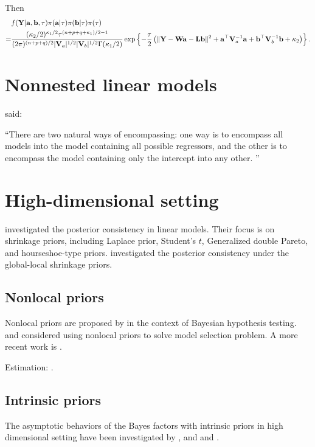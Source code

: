 \documentclass[11pt]{article}
\newcommand{\Ba}{\mathbf{a}}    \newcommand{\Bb}{\mathbf{b}}    \newcommand{\Bc}{\mathbf{c}}    \newcommand{\Bd}{\mathbf{d}}    \newcommand{\Be}{\mathbf{e}}    \newcommand{\Bf}{\mathbf{f}}    \newcommand{\Bg}{\mathbf{g}}    \newcommand{\Bh}{\mathbf{h}}    \newcommand{\Bi}{\mathbf{i}}    \newcommand{\Bj}{\mathbf{j}}    \newcommand{\Bk}{\mathbf{k}}    \newcommand{\Bl}{\mathbf{l}}
\newcommand{\BY}{\mathbf{Y}}    \newcommand{\BZ}{\mathbf{Z}}
\theoremstyle{plain}
\theoremstyle{definition}
\theoremstyle{remark}
\begin{document}
Then
\begin{equation*}
    \begin{split}
    &f(\BY|\Ba,\Bb, \tau)
    \pi(\Ba|\tau)
    \pi(\Bb|\tau)
    \pi(\tau)
    \\
    =&
    \frac{(\kappa_2/2)^{\kappa_1/2}\tau^{(n+p+q+\kappa_1)/2-1}}
    {
        (2\pi)^{(n+p+q)/2} |\BV_a|^{1/2} |\BV_b|^{1/2} \Gamma(\kappa_1/2)
    }
    \exp\left\{
        -\frac{\tau}{2}
        \left( \|\BY-\BW \Ba -\BL \Bb \|^2+\Ba^\top \BV_a^{-1} \Ba + \Bb^\top \BV_b^{-1} \Bb +\kappa_2\right)
    \right\}
    .
    \end{split}
\end{equation*}



\section{Nonnested linear models}
\cite{Moreno2007} said:

``There are two natural ways of encompassing: one way is to encompass all models into the model containing all possible regressors, and the other is to encompass the model containing only the intercept into any other.
''

\section{High-dimensional setting}
\cite{Armagan2013P} investigated the posterior consistency in linear models.
Their focus is on shrinkage priors, including
Laplace prior,
Student's $t$,
Generalized double Pareto, and hourseshoe-type priors.
\cite{Bai2018} investigated the posterior consistency under the global-local shrinkage priors.

\subsection{Nonlocal priors}
Nonlocal priors are proposed by \cite{nonlocalPrior} in the context of Bayesian hypothesis testing.
\cite{Johnson2012} and \cite{Johnson2013} considered using nonlocal priors to solve model selection problem.
A more recent work is \cite{Bhattacharya2018}.

Estimation: \cite{Rossell2017Non}.





\subsection{Intrinsic priors}
The asymptotic behaviors of the Bayes factors with intrinsic priors in high dimensional setting have been investigated by \cite{Casella2009}, \cite{Giron2010} and \cite{moreno2010} and \cite{moreno2015}.
\end{document}
